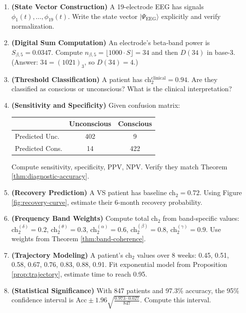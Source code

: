 \begin{enumerate}
\item \textbf{(State Vector Construction)} A 19-electrode EEG has signals $\phi_1(t), \ldots, \phi_{19}(t)$. Write the state vector $|\Psi_{\text{EEG}}\rangle$ explicitly and verify normalization.

\item \textbf{(Digital Sum Computation)} An electrode's beta-band power is $S_{\beta,5} = 0.0347$. Compute $n_{\beta,5} = \lfloor 1000 \cdot S \rfloor = 34$ and then $D(34)$ in base-3. (Answer: $34 = (1021)_3$, so $D(34) = 4$.)

\item \textbf{(Threshold Classification)} A patient has ch$_2^{\text{clinical}} = 0.94$. Are they classified as conscious or unconscious? What is the clinical interpretation?

\item \textbf{(Sensitivity and Specificity)} Given confusion matrix:
\begin{center}
\begin{tabular}{l|cc}
& Unconscious & Conscious \\
\hline
Predicted Unc. & 402 & 9 \\
Predicted Cons. & 14 & 422 \\
\end{tabular}
\end{center}
Compute sensitivity, specificity, PPV, NPV. Verify they match Theorem \ref{thm:diagnostic-accuracy}.

\item \textbf{(Recovery Prediction)} A VS patient has baseline ch$_2 = 0.72$. Using Figure \ref{fig:recovery-curve}, estimate their 6-month recovery probability.

\item \textbf{(Frequency Band Weights)} Compute total ch$_2$ from band-specific values: ch$_2^{(\delta)} = 0.2$, ch$_2^{(\theta)} = 0.3$, ch$_2^{(\alpha)} = 0.6$, ch$_2^{(\beta)} = 0.8$, ch$_2^{(\gamma)} = 0.9$. Use weights from Theorem \ref{thm:band-coherence}.

\item \textbf{(Trajectory Modeling)} A patient's ch$_2$ values over 8 weeks: 0.45, 0.51, 0.58, 0.67, 0.76, 0.83, 0.88, 0.91. Fit exponential model from Proposition \ref{prop:trajectory}, estimate time to reach 0.95.

\item \textbf{(Statistical Significance)} With 847 patients and 97.3\% accuracy, the 95\% confidence interval is $\text{Acc} \pm 1.96\sqrt{\frac{0.973 \cdot 0.027}{847}}$. Compute this interval.
\end{enumerate}

